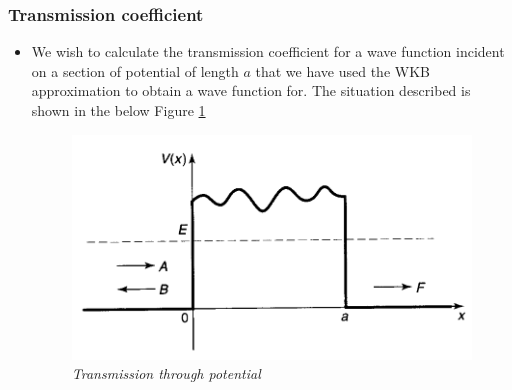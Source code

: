 \documentclass[11pt]{article}
\numberwithin{equation}{section}
\begin{document}
\subsubsection{Transmission coefficient} 
\begin{itemize}
    \item  We wish to calculate the transmission coefficient for a wave function incident on a section of potential of length $a$ that we have used the WKB approximation to obtain a wave function for. The situation described is shown in the below Figure \ref{fig:2}

\begin{figure}[H]
\centering
\includegraphics[width=0.4\linewidth]{image2.png}
\caption[skip=0pt]{\label{fig:2}\emph{Transmission through potential}}
\end{figure}


\end{itemize}
\end{document}
